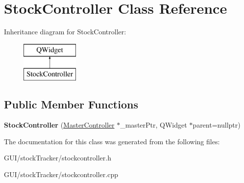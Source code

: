 \hypertarget{class_stock_controller}{}\section{Stock\+Controller Class Reference}
\label{class_stock_controller}
Inheritance diagram for Stock\+Controller\+:\begin{figure}[H]
\begin{center}
\leavevmode
\includegraphics[height=2.000000cm]{class_stock_controller}
\end{center}
\end{figure}
\subsection*{Public Member Functions}
\begin{DoxyCompactItemize}
\item 
\mbox{\label{class_stock_controller_a017d7ebac583be7b5c2cd750b85e2d01}} 
{\bfseries Stock\+Controller} (\mbox{\hyperlink{class_master_controller}{Master\+Controller}} $\ast$\+\_\+master\+Ptr, Q\+Widget $\ast$parent=nullptr)
\end{DoxyCompactItemize}


The documentation for this class was generated from the following files\+:\begin{DoxyCompactItemize}
\item 
G\+U\+I/stock\+Tracker/stockcontroller.\+h\item 
G\+U\+I/stock\+Tracker/stockcontroller.\+cpp\end{DoxyCompactItemize}
